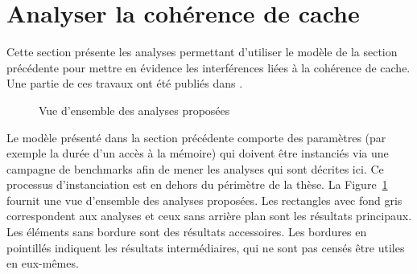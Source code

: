 \section{Analyser la coh\'erence de cache}
\label{fr:sec:analyze}
Cette section présente les analyses permettant d'utiliser le modèle de
la section précédente pour mettre en évidence les interférences liées
à la cohérence de cache. Une partie de ces travaux ont été publiés
dans \cite{ecrts19}.

\begin{figure}[hbt]
  \centering
  \resizebox{.7\linewidth}{!}{
}
\caption{Vue d'ensemble des analyses proposées}
\label{fr:fig:analysis:summary}
\end{figure}

Le modèle présenté dans la section précédente comporte des paramètres (par exemple la durée d'un accès à la mémoire) qui doivent être instanciés via une campagne de benchmarks afin de mener les analyses qui sont décrites ici. Ce processus d'instanciation est en dehors du périmètre de la thèse.
La Figure~\ref{fr:fig:analysis:summary} fournit une vue d'ensemble des analyses
proposées. Les rectangles avec fond gris correspondent aux analyses et ceux sans
arrière plan sont les résultats principaux. Les éléments sans bordure sont des
résultats accessoires. Les bordures en pointillés indiquent les résultats
intermédiaires, qui ne sont pas censés être utiles en eux-mêmes.


